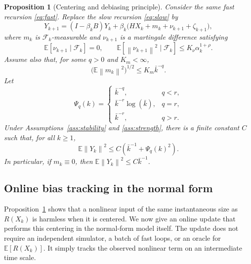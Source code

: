 \documentclass{article}
\newtheorem{proposition}[theorem]{Proposition}
\newcommand{\E}{\mathbb{E}}
\newcommand{\norm}[1]{\left\lVert #1\right\rVert}
\begin{document}
\begin{proposition}[Centering and debiasing principle]\label{prop:centering}
Consider the same fast recursion \eqref{eq:fast}. Replace the slow recursion \eqref{eq:slow} by
\begin{equation}
  Y_{k+1}=(I-\beta_kB)Y_k+\beta_k\big(HX_k+m_k+\nu_{k+1}+\zeta_{k+1}\big), \label{eq:centered-slow}
\end{equation}
where $m_k$ is $\mathcal F_k$-measurable and $\nu_{k+1}$ is a martingale difference satisfying
\begin{equation}
  \E[\nu_{k+1}\mid \mathcal F_k]=0,
  \qquad
  \E[\norm{\nu_{k+1}}^2\mid \mathcal F_k]\le K_\nu\alpha_k^{1+\rho}. \label{eq:nu-assumption}
\end{equation}
Assume also that, for some $q>0$ and $K_m<\infty$,
\begin{equation}
  \big(\E\norm{m_k}^2\big)^{1/2}\le K_m\bar k^{-q}. \label{eq:m-assumption}
\end{equation}
Let
\begin{equation}
  \Psi_q(k)=
  \begin{cases}
    \bar k^{-q}, & q<r,\\
    \bar k^{-r}\log(\bar k), & q=r,\\
    \bar k^{-r}, & q>r.
  \end{cases} \label{eq:psi-q}
\end{equation}
Under Assumptions~\ref{ass:stability} and \ref{ass:strength}, there is a finite constant $C$ such that, for all $k\ge1$,
\begin{equation}
  \E\norm{Y_k}^2\le C\left(\bar k^{-1}+\Psi_q(k)^2\right). \label{eq:centering-rate}
\end{equation}
In particular, if $m_k\equiv0$, then $\E\norm{Y_k}^2\le C\bar k^{-1}$.
\end{proposition}

\subsection{Online bias tracking in the normal form}
\label{subsec:online-bias-tracking}

Proposition~\ref{prop:centering} shows that a nonlinear input of the same instantaneous size as $R(X_k)$ is harmless when it is centered. We now give an online update that performs this centering in the normal-form model itself. The update does not require an independent simulator, a batch of fast loops, or an oracle for $\E[R(X_k)]$. It simply tracks the observed nonlinear term on an intermediate time scale.
\end{document}
